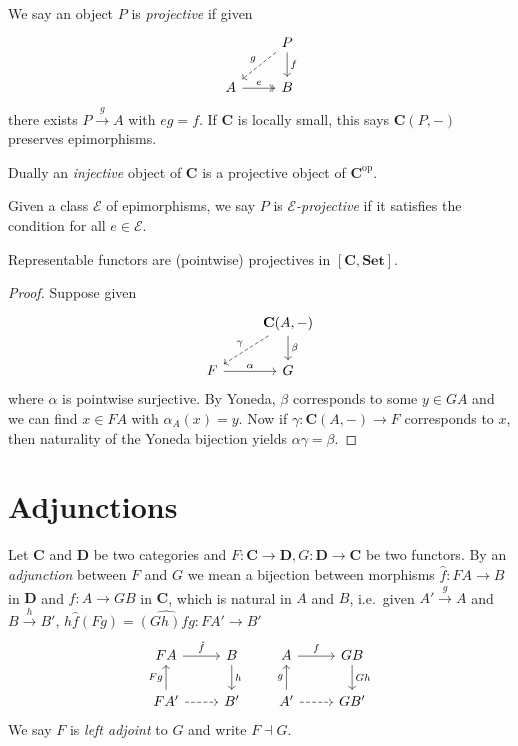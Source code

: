 \documentclass[a4paper]{article}
\renewcommand{\c}[1]{\mathbf{#1}}
\newcommand{\Set}{{\c{Set}}}
\newcommand{\adjoint}{\dashv}
\begin{document}
\begin{definition}
  We say an object \(P\) is \emph{projective} if given
  \[
    \begin{tikzcd}
      & P \ar[d, "f"] \ar[dl, "g"', dashed] \\
      A \ar[r, "e", twoheadrightarrow] & B
    \end{tikzcd}
  \]
  there exists \(P \xrightarrow{g} A\) with \(eg = f\). If \(\c C\) is locally small, this says \(\c C(P, -)\) preserves epimorphisms.

  Dually an \emph{injective} object of \(\c C\) is a projective object of \(\c C^{\text{op}}\).

  Given a class \(\mathcal E\) of epimorphisms, we say \(P\) is \emph{\(\mathcal E\)-projective} if it satisfies the condition for all \(e \in \mathcal E\).
\end{definition}

\begin{lemma}
  \label{lem:representable functors are projectives}
  Representable functors are (pointwise) projectives in \([\c C, \Set]\).
\end{lemma}

\begin{proof}
  Suppose given
  \[
    \begin{tikzcd}
      & \c C(A, -) \ar[d, "\beta"] \ar[dl, "\gamma"', dashed]\\
      F \ar[r, "\alpha"] & G
    \end{tikzcd}
  \]
  where \(\alpha\) is pointwise surjective. By Yoneda, \(\beta\) corresponds to some \(y \in GA\) and we can find \(x \in FA\) with \(\alpha_A(x) = y\). Now if \(\gamma: \c C(A, -) \to F\) corresponds to \(x\), then naturality of the Yoneda bijection yields \(\alpha\gamma = \beta\).
\end{proof}

\section{Adjunctions}

\begin{definition}[adjunction]
  Let \(\c C\) and \(\c D\) be two categories and \(F: \c C \to \c D, G: \c D \to \c C\) be two functors. By an \emph{adjunction} between \(F\) and \(G\) we mean a bijection between morphisms \(\hat f: FA \to B\) in \(\c D\) and \(f: A \to GB\) in \(\c C\), which is natural in \(A\) and \(B\), i.e.\ given \(A' \xrightarrow{g} A\) and \(B \xrightarrow{h} B'\), \(h \hat f(Fg) = \widehat{(Gh) fg}: FA' \to B'\)
  \[
    \begin{tikzcd}
      FA \ar[r, "\hat f"] & B \ar[d, "h"] \\
      FA' \ar[u, "Fg"] \ar[r, dashed] & B'
    \end{tikzcd}
    \qquad
    \begin{tikzcd}
      A \ar[r, "f"] & GB \ar[d, "Gh"] \\
      A' \ar[u, "g"] \ar[r, dashed] & GB'
    \end{tikzcd}
  \]
  We say \(F\) is \emph{left adjoint} to \(G\) and write \(F \adjoint G\).
\end{definition}
\end{document}
